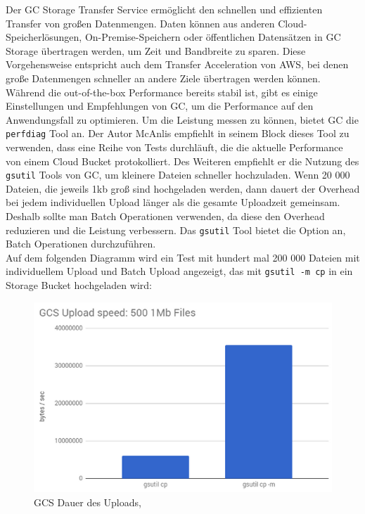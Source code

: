 Der GC Storage Transfer Service ermöglicht den schnellen und effizienten Transfer von großen Datenmengen. Daten können aus anderen Cloud-Speicherlösungen, On-Premise-Speichern oder öffentlichen Datensätzen in GC Storage übertragen werden, um Zeit und Bandbreite zu sparen. Diese Vorgehensweise entspricht auch dem Transfer Acceleration von AWS, bei denen große Datenmengen schneller an andere Ziele übertragen werden können.\\

Während die out-of-the-box Performance bereits stabil ist, gibt es einige Einstellungen und Empfehlungen von GC, um die Performance auf den Anwendungsfall zu optimieren. Um die Leistung messen zu können, bietet GC die \verb|perfdiag| Tool an. Der Autor McAnlis empfiehlt in seinem Block  dieses Tool zu verwenden, dass eine Reihe von Tests durchläuft, die die aktuelle Performance von einem Cloud Bucket protokolliert. Des Weiteren empfiehlt er die Nutzung des \verb|gsutil| Tools von GC, um kleinere Dateien schneller hochzuladen. Wenn 20 000 Dateien, die jeweils 1kb groß sind hochgeladen werden, dann dauert der Overhead bei jedem individuellen Upload länger als die gesamte Uploadzeit gemeinsam. Deshalb sollte man Batch Operationen verwenden, da diese den Overhead reduzieren und die Leistung verbessern. Das \verb|gsutil| Tool bietet die Option an, Batch Operationen durchzuführen.\\ 

Auf dem folgenden Diagramm wird ein Test mit hundert mal 200 000 Dateien mit individuellem Upload und Batch Upload angezeigt, das mit \verb|gsutil -m cp| in ein Storage Bucket hochgeladen wird:

\begin{figure}[!h]
	\centering
	\includegraphics[width=12cm,keepaspectratio]{Pictures/cloud-storage-performance.png}
	\caption{GCS Dauer des Uploads, }
\end{figure}

